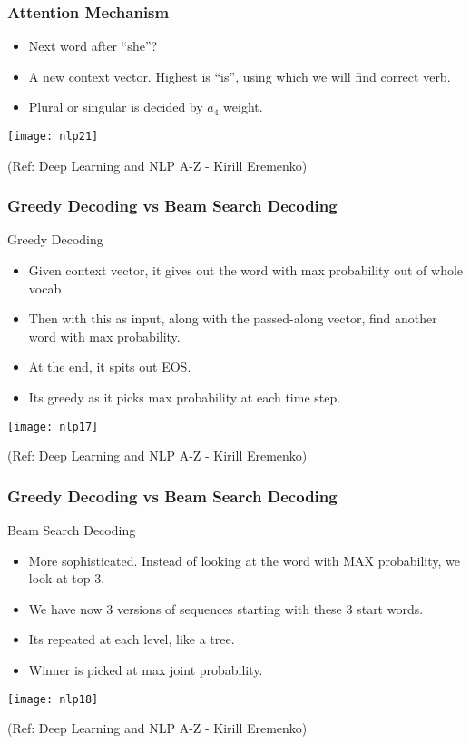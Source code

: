 \begin{frame}[fragile]\frametitle{Attention Mechanism}

\begin{itemize}
\item Next word after ``she''?
\item A new context vector. Highest is ``is'', using which we will find correct verb.
\item Plural or singular is decided by $a_4$ weight.
\end{itemize}
\begin{center}
\texttt{[image: nlp21]}

\tiny{(Ref: Deep Learning and NLP A-Z - Kirill Eremenko)}
\end{center}

\end{frame}



\begin{frame}[fragile]\frametitle{Greedy Decoding vs Beam Search Decoding}
Greedy Decoding
\begin{itemize}
\item Given context vector, it gives out the word with max probability out of whole vocab
\item Then with this as input, along with the passed-along vector, find another word with max probability.
\item At the end, it spits out EOS.
\item Its greedy as it picks max probability at each time step.
\end{itemize}
\begin{center}
\texttt{[image: nlp17]}

\tiny{(Ref: Deep Learning and NLP A-Z - Kirill Eremenko)}
\end{center}

\end{frame}

\begin{frame}[fragile]\frametitle{Greedy Decoding vs Beam Search Decoding}
Beam Search Decoding
\begin{itemize}
\item More sophisticated. Instead of looking at the word with MAX probability, we look at top 3.
\item We have now 3 versions of sequences starting with these 3 start words.
\item Its repeated at each level, like a tree.
\item Winner is picked at max joint probability.
\end{itemize}
\begin{center}
\texttt{[image: nlp18]}

\tiny{(Ref: Deep Learning and NLP A-Z - Kirill Eremenko)}
\end{center}

\end{frame}

